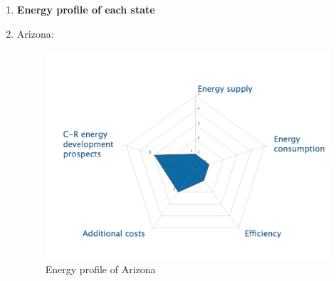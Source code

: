 \documentclass{mcmthesis}
\begin{document}
        \begin{enumerate}
          \item \textbf{Energy profile of each state}

          \item Arizona:
        \begin{figure}
            \centering
            \includegraphics[scale=0.6]{AZ.png}
            \caption{Energy profile of Arizona}
        \end{figure}


\end{enumerate}
\end{document}
